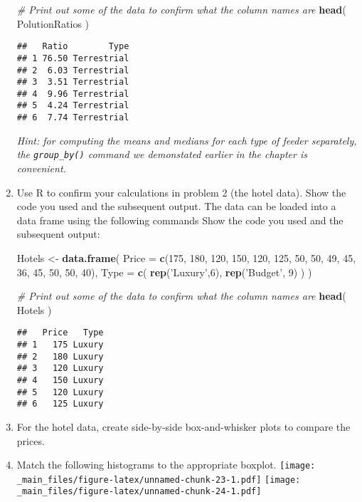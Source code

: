 \documentclass[]{book}
\newenvironment{Shaded}{\begin{snugshade}}{\end{snugshade}}
\newcommand{\KeywordTok}[1]{\textcolor[rgb]{0.13,0.29,0.53}{\textbf{{#1}}}}
\newcommand{\DataTypeTok}[1]{\textcolor[rgb]{0.13,0.29,0.53}{{#1}}}
\newcommand{\DecValTok}[1]{\textcolor[rgb]{0.00,0.00,0.81}{{#1}}}
\newcommand{\StringTok}[1]{\textcolor[rgb]{0.31,0.60,0.02}{{#1}}}
\newcommand{\CommentTok}[1]{\textcolor[rgb]{0.56,0.35,0.01}{\textit{{#1}}}}
\newcommand{\NormalTok}[1]{{#1}}
\begin{document}
\begin{enumerate}
\begin{Shaded}
\begin{Highlighting}[]
\CommentTok{# Print out some of the data to confirm what the column names are}
\KeywordTok{head}\NormalTok{( PolutionRatios )}
\end{Highlighting}
\end{Shaded}

\begin{verbatim}
##   Ratio        Type
## 1 76.50 Terrestrial
## 2  6.03 Terrestrial
## 3  3.51 Terrestrial
## 4  9.96 Terrestrial
## 5  4.24 Terrestrial
## 6  7.74 Terrestrial
\end{verbatim}

  \emph{Hint: for computing the means and medians for each type of
  feeder separately, the \texttt{group\_by()} command we demonstated
  earlier in the chapter is convenient.}
\item
  Use R to confirm your calculations in problem 2 (the hotel data). Show
  the code you used and the subsequent output. The data can be loaded
  into a data frame using the following commands Show the code you used
  and the subsequent output:

\begin{Shaded}
\begin{Highlighting}[]
\NormalTok{Hotels <-}\StringTok{ }\KeywordTok{data.frame}\NormalTok{(}
  \DataTypeTok{Price =} \KeywordTok{c}\NormalTok{(}\DecValTok{175}\NormalTok{, }\DecValTok{180}\NormalTok{, }\DecValTok{120}\NormalTok{, }\DecValTok{150}\NormalTok{, }\DecValTok{120}\NormalTok{, }\DecValTok{125}\NormalTok{, }\DecValTok{50}\NormalTok{, }\DecValTok{50}\NormalTok{, }\DecValTok{49}\NormalTok{, }\DecValTok{45}\NormalTok{, }\DecValTok{36}\NormalTok{, }\DecValTok{45}\NormalTok{, }\DecValTok{50}\NormalTok{, }\DecValTok{50}\NormalTok{, }\DecValTok{40}\NormalTok{),}
  \DataTypeTok{Type  =} \KeywordTok{c}\NormalTok{( }\KeywordTok{rep}\NormalTok{(}\StringTok{'Luxury'}\NormalTok{,}\DecValTok{6}\NormalTok{),  }\KeywordTok{rep}\NormalTok{(}\StringTok{'Budget'}\NormalTok{, }\DecValTok{9}\NormalTok{) ) )}

\CommentTok{# Print out some of the data to confirm what the column names are}
\KeywordTok{head}\NormalTok{( Hotels )}
\end{Highlighting}
\end{Shaded}

\begin{verbatim}
##   Price   Type
## 1   175 Luxury
## 2   180 Luxury
## 3   120 Luxury
## 4   150 Luxury
## 5   120 Luxury
## 6   125 Luxury
\end{verbatim}
\item
  For the hotel data, create side-by-side box-and-whisker plots to
  compare the prices.
\item
  Match the following histograms to the appropriate boxplot.
  \texttt{[image: \_main\_files/figure-latex/unnamed-chunk-23-1.pdf]}
  \texttt{[image: \_main\_files/figure-latex/unnamed-chunk-24-1.pdf]}


\end{enumerate}
\end{document}
